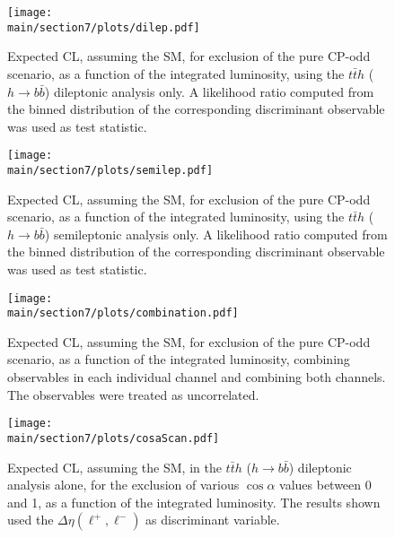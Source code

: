 \documentclass[../report.tex]{subfiles}
\providecommand{\main}{..}
\begin{document}
\begin{figure}[h]
\centering
\begin{minipage}{0.45\textwidth}
 \texttt{[image: \\main/section7/plots/dilep.pdf]}
 \caption{Expected CL, assuming the SM, for exclusion of the pure CP-odd scenario, as a function of the integrated luminosity, using the $t\bar{t}h$ ($h\rightarrow b\bar{b}$) dileptonic analysis only. A likelihood ratio computed from the binned distribution of the corresponding discriminant observable was used as test statistic.}
 \label{dilep}
\end{minipage}
\hfill
\begin{minipage}{0.45\textwidth}
 \texttt{[image: \\main/section7/plots/semilep.pdf]}
 \caption{Expected CL, assuming the SM, for exclusion of the pure CP-odd scenario, as a function of the integrated luminosity, using the $t\bar{t}h$ ($h\rightarrow b\bar{b}$)  semileptonic analysis only. A likelihood ratio computed from the binned distribution of the corresponding discriminant observable was used as test statistic.}
 \label{semilep}
\end{minipage}
%
\begin{minipage}{0.45\textwidth}
 \texttt{[image: \\main/section7/plots/combination.pdf]}
 \caption{Expected CL, assuming the SM, for exclusion of the pure CP-odd scenario, as a function of the integrated luminosity, combining observables in each individual channel and combining both channels. The observables were treated as uncorrelated.}
 \label{combination}
\end{minipage}
\hfill
\begin{minipage}{0.45\textwidth}
 \texttt{[image: \\main/section7/plots/cosaScan.pdf]}
 \caption{Expected CL, assuming the SM, in the $t\bar{t}h$ ($h\rightarrow b\bar{b}$) dileptonic analysis alone, for the exclusion of various $\cos\alpha$ values between 0 and 1, as a function of the integrated luminosity. The results shown used the $\Delta\eta(\ell^+,\ell^-)$ as discriminant variable.}
 \label{cosaScan}
\end{minipage}
%
\end{figure}
\end{document}
